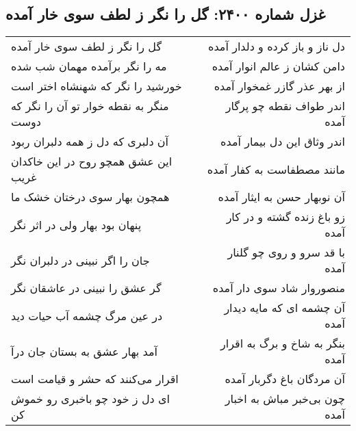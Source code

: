 \begin{center}
\section*{غزل شماره ۲۴۰۰: گل را نگر ز لطف سوی خار آمده}
\label{sec:2400}
\begin{longtable}{l p{0.5cm} r}
گل را نگر ز لطف سوی خار آمده
&&
دل ناز و باز کرده و دلدار آمده
\\
مه را نگر برآمده مهمان شب شده
&&
دامن کشان ز عالم انوار آمده
\\
خورشید را نگر که شهنشاه اختر است
&&
از بهر عذر گازر غمخوار آمده
\\
منگر به نقطه خوار تو آن را نگر که دوست
&&
اندر طواف نقطه چو پرگار آمده
\\
آن دلبری که دل ز همه دلبران ربود
&&
اندر وثاق این دل بیمار آمده
\\
این عشق همچو روح در این خاکدان غریب
&&
مانند مصطفاست به کفار آمده
\\
همچون بهار سوی درختان خشک ما
&&
آن نوبهار حسن به ایثار آمده
\\
پنهان بود بهار ولی در اثر نگر
&&
زو باغ زنده گشته و در کار آمده
\\
جان را اگر نبینی در دلبران نگر
&&
با قد سرو و روی چو گلنار آمده
\\
گر عشق را نبینی در عاشقان نگر
&&
منصوروار شاد سوی دار آمده
\\
در عین مرگ چشمه آب حیات دید
&&
آن چشمه ای که مایه دیدار آمده
\\
آمد بهار عشق به بستان جان درآ
&&
بنگر به شاخ و برگ به اقرار آمده
\\
اقرار می‌کنند که حشر و قیامت است
&&
آن مردگان باغ دگربار آمده
\\
ای دل ز خود چو باخبری رو خموش کن
&&
چون بی‌خبر مباش به اخبار آمده
\\
\end{longtable}
\end{center}
